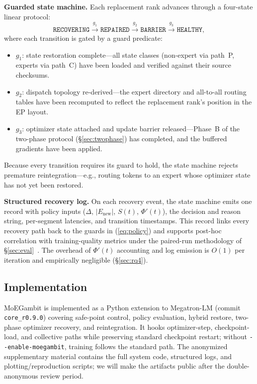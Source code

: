 \documentclass[10pt,conference]{IEEEtran}
\begin{document}
\textbf{Guarded state machine.} Each replacement rank advances through a four-state linear protocol:
\begin{equation}
\label{eq:state-machine}
\texttt{RECOVERING} \xrightarrow{g_1} \texttt{REPAIRED} \xrightarrow{g_2} \texttt{BARRIER} \xrightarrow{g_3} \texttt{HEALTHY},
\end{equation}
where each transition is gated by a guard predicate:
\begin{itemize}
    \item $g_1$: state restoration complete---all state classes (non-expert via path~P, experts via path~C) have been loaded and verified against their source checksums.
    \item $g_2$: dispatch topology re-derived---the expert directory and all-to-all routing tables have been recomputed to reflect the replacement rank's position in the EP layout.
    \item $g_3$: optimizer state attached and update barrier released---Phase~B of the two-phase protocol (\S\ref{sec:twophase}) has completed, and the buffered gradients have been applied.
\end{itemize}
Because every transition requires its guard to hold, the state machine rejects premature reintegration---e.g., routing tokens to an expert whose optimizer state has not yet been restored.

\textbf{Structured recovery log.} On each recovery event, the state machine emits one record with policy inputs ($\Delta$, $|E_{\text{new}}|$, $S(t)$, $\Phi'(t)$), the decision and reason string, per-segment latencies, and transition timestamps. This record links every recovery path back to the guards in (\ref{eq:policy}) and supports post-hoc correlation with training-quality metrics under the paired-run methodology of \S\ref{sec:eval}~\cite{wohlin2012ese,arcuri2014hitchhiker}. The overhead of $\Phi'(t)$ accounting and log emission is $O(1)$ per iteration and empirically negligible (\S\ref{sec:rq4}).

\subsection{Implementation}
\label{sec:impl}

MoEGambit is implemented as a Python extension to Megatron-LM (commit \texttt{core\_r0.9.0}) covering safe-point control, policy evaluation, hybrid restore, two-phase optimizer recovery, and reintegration. It hooks optimizer-step, checkpoint-load, and collective paths while preserving standard checkpoint restart; without \texttt{-{}-enable-moegambit}, training follows the standard path. The anonymized supplementary material contains the full system code, structured logs, and plotting/reproduction scripts; we will make the artifacts public after the double-anonymous review period.
\end{document}
